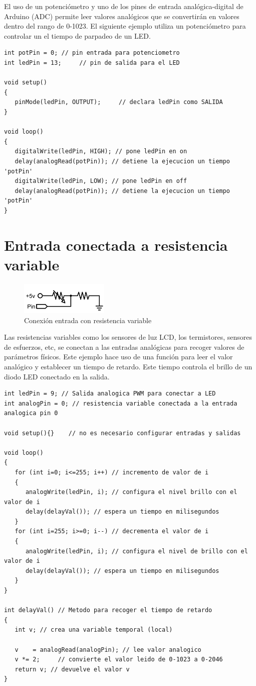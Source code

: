 El uso de un potenciómetro y uno de los pines de entrada analógica-digital de Arduino (ADC) permite leer valores analógicos que se convertirán en valores dentro del rango de 0-1023. El siguiente ejemplo utiliza un potenciómetro para controlar un el tiempo de parpadeo de un LED.
\begin{lstlisting}
int potPin = 0; // pin entrada para potenciometro
int ledPin = 13;     // pin de salida para el LED

void setup()
{
   pinMode(ledPin, OUTPUT);     // declara ledPin como SALIDA
}

void loop()
{
   digitalWrite(ledPin, HIGH); // pone ledPin en on
   delay(analogRead(potPin)); // detiene la ejecucion un tiempo 'potPin'
   digitalWrite(ledPin, LOW); // pone ledPin en off
   delay(analogRead(potPin)); // detiene la ejecucion un tiempo 'potPin'
}
\end{lstlisting}
\newpage{}
\section{Entrada conectada a resistencia variable}

\begin{figure}[!htp]
	\centering
	\includegraphics[width=120pt]{./Imagenes/Documentos/ArduinoNotebook_img06.png}
	\caption[Conexión entrada con resistencia variable]{Conexión entrada con resistencia variable}
\end{figure}
Las resistencias variables como los sensores de luz LCD, los termistores, sensores de esfuerzos, etc, se conectan a las entradas analógicas para recoger valores de parámetros físicos. Este ejemplo hace uso de una función para leer el valor analógico y establecer un tiempo de retardo. Este tiempo controla el brillo de un diodo LED conectado en la salida.
\begin{lstlisting}
int ledPin = 9; // Salida analogica PWM para conectar a LED
int analogPin = 0; // resistencia variable conectada a la entrada analogica pin 0

void setup(){}    // no es necesario configurar entradas y salidas

void loop()
{
   for (int i=0; i<=255; i++) // incremento de valor de i
   {
      analogWrite(ledPin, i); // configura el nivel brillo con el valor de i
      delay(delayVal()); // espera un tiempo en milisegundos
   }
   for (int i=255; i>=0; i--) // decrementa el valor de i
   {
      analogWrite(ledPin, i); // configura el nivel de brillo con el valor de i
      delay(delayVal()); // espera un tiempo en milisegundos
   }
}

int delayVal() // Metodo para recoger el tiempo de retardo
{
   int v; // crea una variable temporal (local)

   v    = analogRead(analogPin); // lee valor analogico
   v *= 2;     // convierte el valor leido de 0-1023 a 0-2046
   return v; // devuelve el valor v
}
\end{lstlisting}
